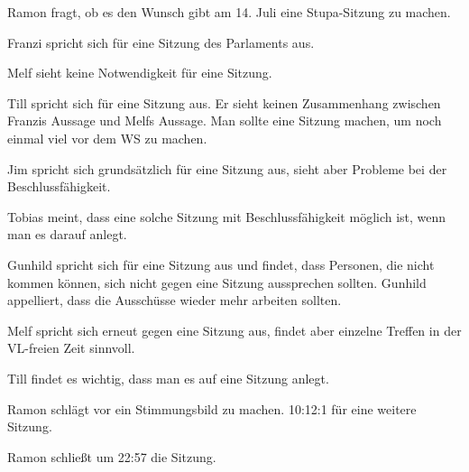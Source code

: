 \documentclass[ngerman,headheight=70pt]{scrartcl}
\begin{document}
    Ramon fragt, ob es den Wunsch gibt am 14. Juli eine Stupa-Sitzung zu machen.

    Franzi spricht sich für eine Sitzung des Parlaments aus.

    Melf sieht keine Notwendigkeit für eine Sitzung.

    Till spricht sich für eine Sitzung aus. Er sieht keinen Zusammenhang
    zwischen Franzis Aussage und Melfs Aussage. Man sollte eine Sitzung machen,
    um noch einmal viel vor dem WS zu machen.

    Jim spricht sich grundsätzlich für eine Sitzung aus, sieht aber Probleme
    bei der Beschlussfähigkeit.

    Tobias meint, dass eine solche Sitzung mit Beschlussfähigkeit möglich ist,
    wenn man es darauf anlegt.

    Gunhild spricht sich für eine Sitzung aus und findet, dass Personen, die nicht
    kommen können, sich nicht gegen eine Sitzung aussprechen sollten.
    Gunhild appelliert, dass die Ausschüsse wieder mehr arbeiten sollten.

    Melf spricht sich erneut gegen eine Sitzung aus, findet aber einzelne
    Treffen in der VL-freien Zeit sinnvoll.

    Till findet es wichtig, dass man es auf eine Sitzung anlegt.

    Ramon schlägt vor ein Stimmungsbild zu machen. 10:12:1 für eine weitere Sitzung.

    Ramon schließt um 22:57 die Sitzung.
\end{document}
